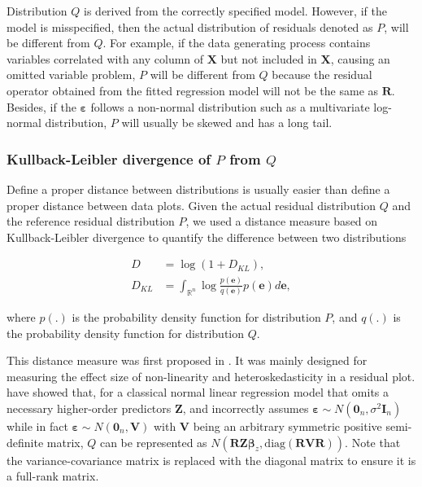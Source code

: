 \documentclass[]{interact}
\theoremstyle{plain}%
\theoremstyle{definition}
\theoremstyle{remark}
\begin{document}
Distribution \(Q\) is derived from the correctly specified model.
However, if the model is misspecified, then the actual distribution of
residuals denoted as \(P\), will be different from \(Q\). For example,
if the data generating process contains variables correlated with any
column of \(\boldsymbol{X}\) but not included in \(\boldsymbol{X}\),
causing an omitted variable problem, \(P\) will be different from \(Q\)
because the residual operator obtained from the fitted regression model
will not be the same as \(\boldsymbol{R}\). Besides, if the
\(\boldsymbol{\varepsilon}\) follows a non-normal distribution such as a
multivariate log-normal distribution, \(P\) will usually be skewed and
has a long tail.

\subsubsection{\texorpdfstring{Kullback-Leibler divergence of \(P\) from
\(Q\)}{Kullback-Leibler divergence of P from Q}}\label{kullback-leibler-divergence-of-p-from-q}

Define a proper distance between distributions is usually easier than
define a proper distance between data plots. Given the actual residual
distribution \(Q\) and the reference residual distribution \(P\), we
used a distance measure based on Kullback-Leibler divergence
\citep{kullback1951information} to quantify the difference between two
distributions

\begin{align}
\label{eq:kl-0}
D &= \log\left(1 + D_{KL}\right), \\
\label{eq:kl-1}
D_{KL} &= \int_{\mathbb{R}^{n}}\log\frac{p(\boldsymbol{e})}{q(\boldsymbol{e})}p(\boldsymbol{e})d\boldsymbol{e},
\end{align}

\noindent where \(p(.)\) is the probability density function for
distribution \(P\), and \(q(.)\) is the probability density function for
distribution \(Q\).

This distance measure was first proposed in \citet{li2023plot}. It was
mainly designed for measuring the effect size of non-linearity and
heteroskedasticity in a residual plot. \citet{li2023plot} have showed
that, for a classical normal linear regression model that omits a
necessary higher-order predictors \(\boldsymbol{Z}\), and incorrectly
assumes
\(\boldsymbol{\varepsilon} \sim N(\boldsymbol{0}_n,\sigma^2\boldsymbol{I}_n)\)
while in fact
\(\boldsymbol{\varepsilon} \sim N(\boldsymbol{0}_n, \boldsymbol{V})\)
with \(\boldsymbol{V}\) being an arbitrary symmetric positive
semi-definite matrix, \(Q\) can be represented as
\(N(\boldsymbol{R}\boldsymbol{Z}\boldsymbol{\beta}_z, \text{diag}(\boldsymbol{R}\boldsymbol{V}\boldsymbol{R}))\).
Note that the variance-covariance matrix is replaced with the diagonal
matrix to ensure it is a full-rank matrix.
\end{document}
